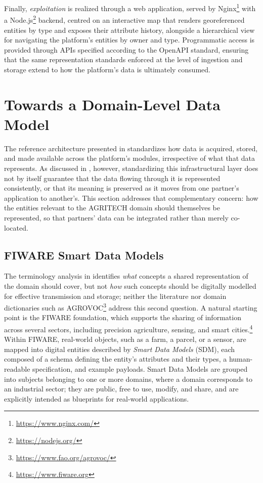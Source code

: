 Finally, \emph{exploitation} is realized through a web application, served by Nginx\footnote{\url{https://www.nginx.com/}} with a Node.js\footnote{\url{https://nodejs.org/}} backend, centred on an interactive map that renders georeferenced entities by type and exposes their attribute history, alongside a hierarchical view for navigating the platform's entities by owner and type. Programmatic access is provided through APIs specified according to the OpenAPI standard, ensuring that the same representation standards enforced at the level of ingestion and storage extend to how the platform's data is ultimately consumed.

\section{Towards a Domain-Level Data Model}
\label{sec:dataplat-datamodel}

The reference architecture presented in  standardizes how data is acquired, stored, and made available across the platform's modules, irrespective of what that data represents. As discussed in , however, standardizing this infrastructural layer does not by itself guarantee that the data flowing through it is represented consistently, or that its meaning is preserved as it moves from one partner's application to another's. This section addresses that complementary concern: how the entities relevant to the AGRITECH domain should themselves be represented, so that partners' data can be integrated rather than merely co-located.

\subsection{FIWARE Smart Data Models}

The terminology analysis in  identifies \emph{what} concepts a shared representation of the domain should cover, but not \emph{how} such concepts should be digitally modelled for effective transmission and storage; neither the literature nor domain dictionaries such as AGROVOC\footnote{\url{https://www.fao.org/agrovoc/}} address this second question. A natural starting point is the FIWARE foundation, which supports the sharing of information across several sectors, including precision agriculture, sensing, and smart cities.\footnote{\url{https://www.fiware.org}} Within FIWARE, real-world objects, such as a farm, a parcel, or a sensor, are mapped into digital entities described by \emph{Smart Data Models} (SDM), each composed of a schema defining the entity's attributes and their types, a human-readable specification, and example payloads. Smart Data Models are grouped into subjects belonging to one or more domains, where a domain corresponds to an industrial sector; they are public, free to use, modify, and share, and are explicitly intended as blueprints for real-world applications.

